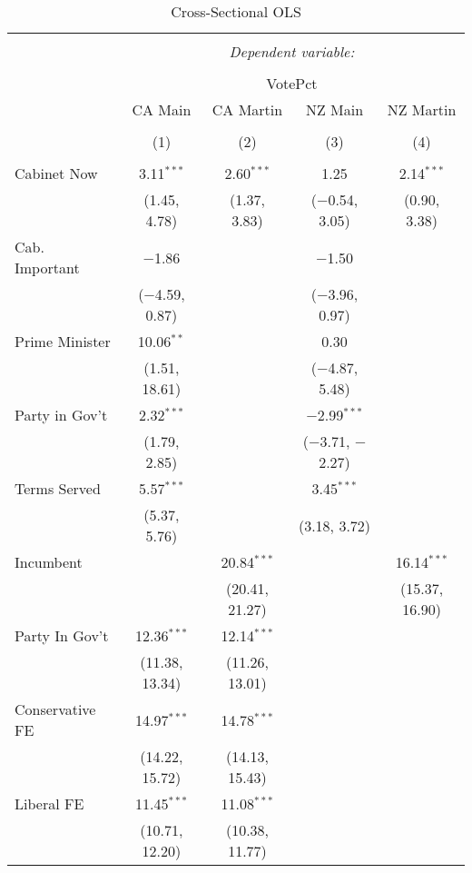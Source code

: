 
\begin{table}[!htb] \centering 
  \caption{Cross-Sectional OLS} 
  \label{} 
\begin{tabular}{@{\extracolsep{5pt}}lcccc} 
\\[-1.8ex]\hline 
\hline \\[-1.8ex] 
 & \multicolumn{4}{c}{\textit{Dependent variable:}} \\ 
\cline{2-5} 
\\[-1.8ex] & \multicolumn{4}{c}{VotePct} \\ 
 & CA Main & CA Martin & NZ Main & NZ Martin \\ 
\\[-1.8ex] & (1) & (2) & (3) & (4)\\ 
\hline \\[-1.8ex] 
 Cabinet Now & 3.11$^{***}$ & 2.60$^{***}$ & 1.25 & 2.14$^{***}$ \\ 
  & (1.45, 4.78) & (1.37, 3.83) & ($-$0.54, 3.05) & (0.90, 3.38) \\ 
  Cab. Important & $-$1.86 &  & $-$1.50 &  \\ 
  & ($-$4.59, 0.87) &  & ($-$3.96, 0.97) &  \\ 
  Prime Minister & 10.06$^{**}$ &  & 0.30 &  \\ 
  & (1.51, 18.61) &  & ($-$4.87, 5.48) &  \\ 
  Party in Gov't & 2.32$^{***}$ &  & $-$2.99$^{***}$ &  \\ 
  & (1.79, 2.85) &  & ($-$3.71, $-$2.27) &  \\ 
  Terms Served & 5.57$^{***}$ &  & 3.45$^{***}$ &  \\ 
  & (5.37, 5.76) &  & (3.18, 3.72) &  \\ 
  Incumbent &  & 20.84$^{***}$ &  & 16.14$^{***}$ \\ 
  &  & (20.41, 21.27) &  & (15.37, 16.90) \\ 
  Party In Gov't & 12.36$^{***}$ & 12.14$^{***}$ &  &  \\ 
  & (11.38, 13.34) & (11.26, 13.01) &  &  \\ 
  Conservative FE & 14.97$^{***}$ & 14.78$^{***}$ &  &  \\ 
  & (14.22, 15.72) & (14.13, 15.43) &  &  \\ 
  Liberal FE & 11.45$^{***}$ & 11.08$^{***}$ &  &  \\ 
  & (10.71, 12.20) & (10.38, 11.77) &  &  \\ 

\end{tabular}
\end{table}
